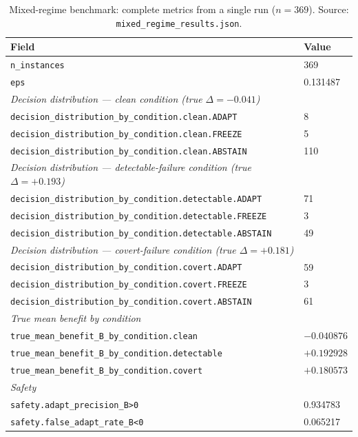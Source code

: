 \begin{table}[ht]
\centering
\caption{Mixed-regime benchmark: complete metrics from a single run ($n = 369$).
  Source: \texttt{mixed\_regime\_results.json}.}
\label{tab:full-mixed}
\begin{tabular}{ll}
\toprule
Field & Value \\
\midrule
\texttt{n\_instances}  & 369 \\
\texttt{eps}           & 0.131487 \\
\midrule
\textit{Decision distribution --- clean condition (true $\Delta = -0.041$)} & \\
\texttt{decision\_distribution\_by\_condition.clean.ADAPT}    & 8 \\
\texttt{decision\_distribution\_by\_condition.clean.FREEZE}   & 5 \\
\texttt{decision\_distribution\_by\_condition.clean.ABSTAIN}  & 110 \\
\midrule
\textit{Decision distribution --- detectable-failure condition (true $\Delta = +0.193$)} & \\
\texttt{decision\_distribution\_by\_condition.detectable.ADAPT}    & 71 \\
\texttt{decision\_distribution\_by\_condition.detectable.FREEZE}   & 3 \\
\texttt{decision\_distribution\_by\_condition.detectable.ABSTAIN}  & 49 \\
\midrule
\textit{Decision distribution --- covert-failure condition (true $\Delta = +0.181$)} & \\
\texttt{decision\_distribution\_by\_condition.covert.ADAPT}    & 59 \\
\texttt{decision\_distribution\_by\_condition.covert.FREEZE}   & 3 \\
\texttt{decision\_distribution\_by\_condition.covert.ABSTAIN}  & 61 \\
\midrule
\textit{True mean benefit by condition} & \\
\texttt{true\_mean\_benefit\_B\_by\_condition.clean}       & $-0.040876$ \\
\texttt{true\_mean\_benefit\_B\_by\_condition.detectable}  & $+0.192928$ \\
\texttt{true\_mean\_benefit\_B\_by\_condition.covert}      & $+0.180573$ \\
\midrule
\textit{Safety} & \\
\texttt{safety.adapt\_precision\_B>0}       & 0.934783 \\
\texttt{safety.false\_adapt\_rate\_B\textless{}0} & 0.065217 \\

\end{tabular}
\end{table}
